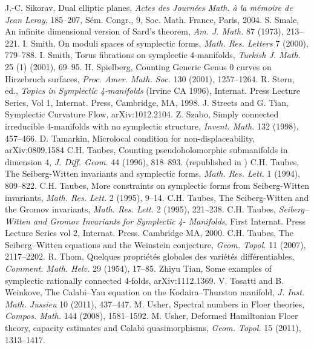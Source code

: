  J.-C. Sikorav, Dual elliptic planes, \emph{Actes des Journées Math. à la mémoire de Jean Leray}, 185--207, Sém. Congr., 9, Soc. Math. France, Paris, 2004.
 S. Smale, An infinite dimensional version of Sard’s theorem, \emph{Am. J. Math.} 87 (1973), 213--221.
 I. Smith, On moduli spaces of symplectic forms, \emph{Math. Res. Letters} 7 (2000), 779--788.
 I. Smith, Torus fibrations on symplectic 4-manifolds, \emph{Turkish J. Math.} 25 (1) (2001), 69--95.
 H. Spielberg, Counting Generic Genus 0 curves on Hirzebruch surfaces, \emph{Proc. Amer. Math. Soc.} 130 (2001), 1257--1264.
 R. Stern, ed., \emph{Topics in Symplectic 4-manifolds} (Irvine CA 1996), Internat. Press Lecture Series, Vol 1, Internat. Press, Cambridge, MA, 1998.
 J. Streets and G. Tian, Symplectic Curvature Flow, arXiv:1012.2104.
 Z. Szabo, Simply connected irreducible 4-manifolds with no symplectic structure, \emph{Invent. Math.} 132 (1998), 457--466.
 D. Tamarkin, Microlocal condition for non-displaceability, arXiv:0809.1584
 C.H. Taubes, Counting pseudoholomorphic submanifolds in dimension 4, \emph{J. Diff. Geom.} 44 (1996), 818--893. (republished in \cite{src-393})
 C.H. Taubes, The Seiberg-Witten invariants and symplectic forms, \emph{Math. Res. Lett.} 1 (1994), 809--822.
 C.H. Taubes, More constraints on symplectic forms from Seiberg-Witten invariants, \emph{Math. Res. Lett.} 2 (1995), 9--14.
 C.H. Taubes, The Seiberg-Witten and the Gromov invariants, \emph{Math. Res. Lett.} 2 (1995), 221--238.
 C.H. Taubes, \emph{Seiberg--Witten and Gromov Invariants for Symplectic 4- Manifolds}, First Internat. Press Lecture Series vol 2, Internat. Press. Cambridge MA, 2000.
 C.H. Taubes, The Seiberg--Witten equations and the Weinstein conjecture, \emph{Geom. Topol.} 11 (2007), 2117--2202.
 R. Thom, Quelques propriétés globales des variétés différentiables, \emph{Comment. Math. Helv.} 29 (1954), 17--85.
 Zhiyu Tian, Some examples of symplectic rationally connected 4-folds, arXiv:1112.1369.
 V. Tosatti and B. Weinkove, The Calabi--Yau equation on the Kodaira--Thurston manifold, \emph{J. Inst. Math. Jussieu} 10 (2011), 437--447.
 M. Usher, Spectral numbers in Floer theories, \emph{Compos. Math.} 144 (2008), 1581--1592.
 M. Usher, Deformed Hamiltonian Floer theory, capacity estimates and Calabi quasimorphisms, \emph{Geom. Topol.} 15 (2011), 1313--1417.
